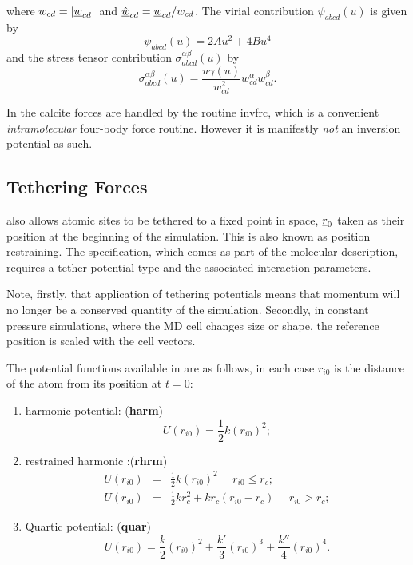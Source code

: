 where $w_{cd}=|\mbox{$\underline{w}$}_{cd}|$ and $\hat{\mbox{$\underline{w}$}}_{cd}=\mbox{$\underline{w}$}_{cd}/w_{cd}$.
The virial contribution $\psi_{abcd}(u)$ is given by
\begin{equation}
\psi_{abcd}(u)=2Au^{2}+4Bu^{4}
\end{equation}
and the stress tensor contribution $\sigma_{abcd}^{\alpha\beta}(u)$ by
\begin{equation}
\sigma_{abcd}^{\alpha\beta}(u)=\frac{u\gamma(u)}{
  w_{cd}^{2}}w_{cd}^{\alpha}w_{cd}^{\beta}.
\end{equation}

In \D{} the calcite forces are handled by the routine
{\sc invfrc}, which is a convenient {\em intramolecular} four-body force
routine. However it is manifestly {\em not} an inversion potential as such.

\subsection{Tethering Forces}

\D{} also allows atomic sites to be tethered to a fixed point in space, $\mbox{$\underline{r}$}_0$ taken as their
position at the beginning of the simulation. This is also known as position restraining.
The specification, which comes as part of the molecular description,
requires a tether potential type and the associated interaction parameters.

Note, firstly, that application of tethering potentials means that momentum will
no longer be a conserved quantity of the simulation. Secondly, in constant
pressure simulations, where the MD cell changes size or shape, the reference position
is scaled with the cell vectors.

The potential functions available in \D{} are as
follows, in each case $r_{i0}$ is the distance of the atom from its position at $t=0$:
\begin{enumerate}
\item harmonic potential: ({\bf harm})
\begin{equation}
U(r_{i0}) = \frac{1}{2}k(r_{i0})^2;
\end{equation}
\item restrained harmonic :({\bf rhrm})
\begin{eqnarray}
U(r_{i0})&=&\frac{1}{2}k(r_{i0})^2~~~~~~r_{i0}\le r_{c};\\
U(r_{i0})&=&\frac{1}{2}kr_{c}^2+kr_{c}(r_{i0}-r_{c})~~~~~~r_{i0}>r_{c};
\end{eqnarray}
\item Quartic potential: ({\bf quar})
\begin{equation}
U(r_{i0})=\frac{k}{2}(r_{i0})^2+\frac{k'}{3}(r_{i0})^3+\frac{k''}{4}(r_{i0})^4.
\end{equation}
\end{enumerate}

